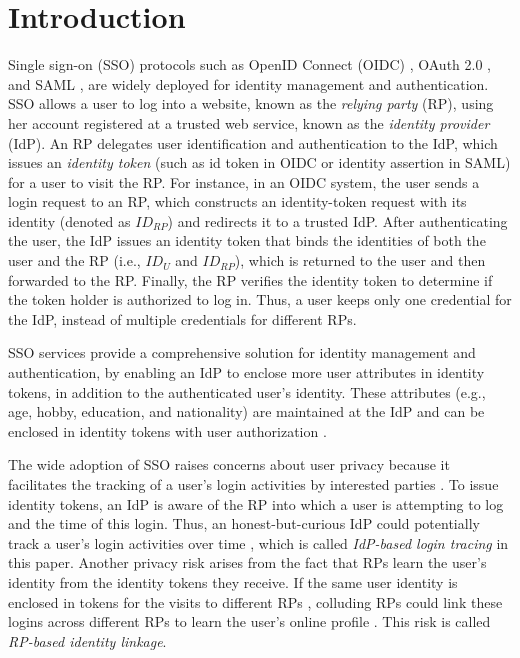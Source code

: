 \section{Introduction}
\label{sec:intro}
Single sign-on (SSO) protocols such as OpenID Connect (OIDC) \cite{OpenIDConnect}, OAuth 2.0 \cite{rfc6749}, and SAML \cite{SAML, SAMLIdentifier}, are widely deployed for identity management and authentication.
SSO allows a user to log into a website,
 known as the \emph{relying party} (RP), using her account registered at a trusted web service, known as the \emph{identity provider} (IdP).
An RP delegates user identification and authentication to the IdP, which issues an \emph{identity token} (such as id token in OIDC or identity assertion in SAML) for a user to visit the RP. %
For instance, in an OIDC system, the user sends a login request to an RP,
which constructs an identity-token request with its identity (denoted as $ID_{RP}$) and redirects it to a trusted IdP. After authenticating the user, the IdP issues an identity token that binds the identities of both the user and the RP (i.e., $ID_U$ and $ID_{RP}$), which is returned to the user and then forwarded to the RP.
Finally, the RP verifies the identity token to determine if the token holder is authorized to log in. Thus, a user keeps only one credential for the IdP, instead of multiple credentials for different RPs.

SSO services provide a comprehensive solution for identity management and authentication,
 by enabling an IdP to enclose more user attributes in identity tokens, in addition to the authenticated user's identity.
These attributes (e.g., age, hobby, education, and nationality) are maintained at the IdP and can be enclosed in identity tokens with user authorization \cite{OpenIDConnect,rfc6749}.

The wide adoption of SSO raises concerns about user privacy because it facilitates the tracking of a user's login activities by interested parties \cite{NIST2017draft, SPRESSO, BrowserID, maler2008venn}.
To issue identity tokens, %
 an IdP is aware of the RP into which a user is attempting to log and the time of this login.
Thus, an honest-but-curious IdP could potentially track a user's login activities over time \cite{BrowserID, SPRESSO},
which is called {\em IdP-based login tracing} in this paper.
Another privacy risk arises from the fact that RPs learn the user's identity from the identity tokens they receive.
If the same user identity is enclosed in tokens for the visits to different RPs \cite{maler2008venn, Google, FirefoxAccount}, colluding RPs could link these logins across different RPs %
to learn the user's online profile \cite{maler2008venn}.
This risk is called {\em RP-based identity linkage}.


